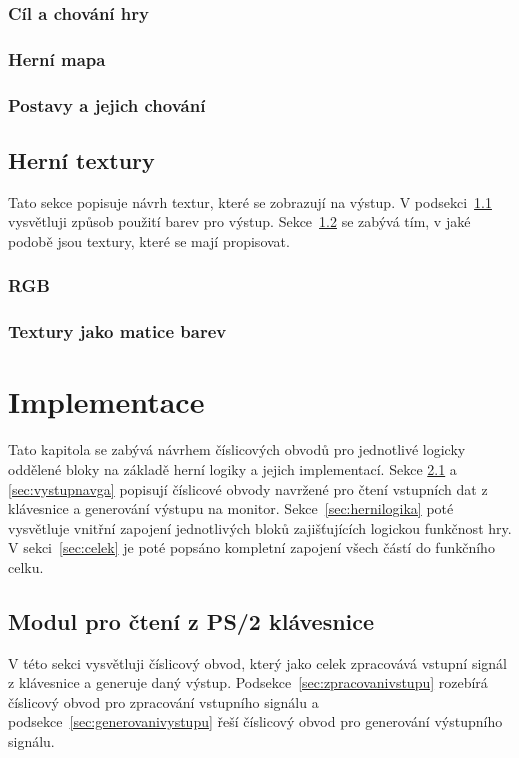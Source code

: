 \documentclass{report}
\begin{document}
\subsection{Cíl a chování hry}\label{sec:cilachovani}
\subsection{Herní mapa}\label{sec:mapajakomrizka}
\subsection{Postavy a jejich chování}\label{sec:postavyachovani}

\section{Herní textury}\label{sec:hernitextury}
Tato sekce popisuje návrh textur, které se zobrazují na výstup. V podsekci~\ref{sec:RGB} vysvětluji způsob použití barev pro výstup. Sekce~\ref{sec:texturyjakomatice} se zabývá tím, v jaké podobě jsou textury, které se mají propisovat. 
\subsection{RGB}\label{sec:RGB}
\subsection{Textury jako matice barev}\label{sec:texturyjakomatice}

\chapter{Implementace}
Tato kapitola se zabývá návrhem číslicových obvodů pro jednotlivé logicky oddělené bloky na základě herní logiky a jejich implementací. Sekce \ref{sec:ctenizps2} a \ref{sec:vystupnavga} popisují číslicové obvody navržené pro čtení vstupních dat z klávesnice a generování výstupu na monitor. Sekce~\ref{sec:hernilogika} poté vysvětluje vnitřní zapojení jednotlivých bloků zajišťujících logickou funkčnost hry. V sekci~\ref{sec:celek} je poté popsáno kompletní zapojení všech částí do funkčního celku.

\section{Modul pro čtení z PS/2 klávesnice}\label{sec:ctenizps2}
V této sekci vysvětluji číslicový obvod, který jako celek zpracovává vstupní signál z klávesnice a generuje daný výstup. Podsekce~\ref{sec:zpracovanivstupu} rozebírá číslicový obvod pro zpracování vstupního signálu a podsekce~\ref{sec:generovanivystupu} řeší číslicový obvod pro generování výstupního signálu.
\end{document}
